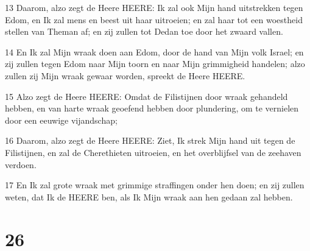 \par 13 Daarom, alzo zegt de Heere HEERE: Ik zal ook Mijn hand uitstrekken tegen Edom, en Ik zal mens en beest uit haar uitroeien; en zal haar tot een woestheid stellen van Theman af; en zij zullen tot Dedan toe door het zwaard vallen.
\par 14 En Ik zal Mijn wraak doen aan Edom, door de hand van Mijn volk Israel; en zij zullen tegen Edom naar Mijn toorn en naar Mijn grimmigheid handelen; alzo zullen zij Mijn wraak gewaar worden, spreekt de Heere HEERE.
\par 15 Alzo zegt de Heere HEERE: Omdat de Filistijnen door wraak gehandeld hebben, en van harte wraak geoefend hebben door plundering, om te vernielen door een eeuwige vijandschap;
\par 16 Daarom, alzo zegt de Heere HEERE: Ziet, Ik strek Mijn hand uit tegen de Filistijnen, en zal de Cherethieten uitroeien, en het overblijfsel van de zeehaven verdoen.
\par 17 En Ik zal grote wraak met grimmige straffingen onder hen doen; en zij zullen weten, dat Ik de HEERE ben, als Ik Mijn wraak aan hen gedaan zal hebben.

\chapter{26}

